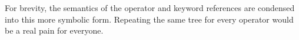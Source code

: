 \begin{prooftree}
\end{prooftree}

For brevity, the semantics of the operator and keyword references are condensed
into this more symbolic form. Repeating the same tree for every operator would
be a real pain for everyone.

\begin{prooftree}
\end{prooftree}

\begin{prooftree}
\end{prooftree}

\begin{prooftree}
\end{prooftree}
